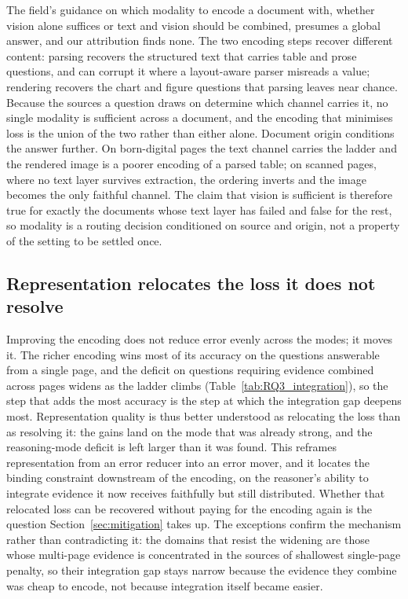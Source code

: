 \documentclass[11pt]{article}
\begin{document}
The field's guidance on which modality to encode a document with, whether vision alone suffices or text and vision should be combined, presumes a global answer, and our attribution finds none. The two encoding steps recover different content: parsing recovers the structured text that carries table and prose questions, and can corrupt it where a layout-aware parser misreads a value; rendering recovers the chart and figure questions that parsing leaves near chance. Because the sources a question draws on determine which channel carries it, no single modality is sufficient across a document, and the encoding that minimises loss is the union of the two rather than either alone. Document origin conditions the answer further. On born-digital pages the text channel carries the ladder and the rendered image is a poorer encoding of a parsed table; on scanned pages, where no text layer survives extraction, the ordering inverts and the image becomes the only faithful channel. The claim that vision is sufficient is therefore true for exactly the documents whose text layer has failed and false for the rest, so modality is a routing decision conditioned on source and origin, not a property of the setting to be settled once.

\subsection{Representation relocates the loss it does not resolve}
\label{subsec:attr_relocation}

Improving the encoding does not reduce error evenly across the modes; it moves it. The richer encoding wins most of its accuracy on the questions answerable from a single page, and the deficit on questions requiring evidence combined across pages widens as the ladder climbs (Table~\ref{tab:RQ3_integration}), so the step that adds the most accuracy is the step at which the integration gap deepens most. Representation quality is thus better understood as relocating the loss than as resolving it: the gains land on the mode that was already strong, and the reasoning-mode deficit is left larger than it was found. This reframes representation from an error reducer into an error mover, and it locates the binding constraint downstream of the encoding, on the reasoner's ability to integrate evidence it now receives faithfully but still distributed. Whether that relocated loss can be recovered without paying for the encoding again is the question Section~\ref{sec:mitigation} takes up. The exceptions confirm the mechanism rather than contradicting it: the domains that resist the widening are those whose multi-page evidence is concentrated in the sources of shallowest single-page penalty, so their integration gap stays narrow because the evidence they combine was cheap to encode, not because integration itself became easier.
\end{document}
